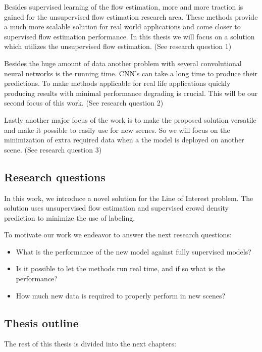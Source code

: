 Besides supervised learning of the flow estimation, more and more traction is gained for the unsupervised flow estimation research area. These methods provide a much more scalable solution for real world applications and come closer to supervised flow estimation performance. In this thesis we will focus on a solution which utilizes the unsupervised flow estimation. (See research question 1)

Besides the huge amount of data another problem with several convolutional neural networks is the running time. CNN’s can take a long time to produce their predictions. To make methods applicable for real life applications quickly producing results with minimal performance degrading is crucial. This will be our second focus of this work. (See research question 2)

Lastly another major focus of the work is to make the proposed solution versatile and make it possible to easily use for new scenes. So we will focus on the minimization of extra required data when a the model is deployed on another scene. (See research question 3)

\subsection{Research questions}
In this work, we introduce a novel solution for the Line of Interest problem. The solution uses unsupervised flow estimation and supervised crowd density prediction to minimize the use of labeling.

To motivate our work we endeavor to answer the next research questions:
\begin{itemize}
    \item What is the performance of the new model against fully supervised models?
    \item Is it possible to let the methods run real time, and if so what is the performance?
    \item How much new data is required to properly perform in new scenes?
\end{itemize}

\subsection{Thesis outline}
The rest of this thesis is divided into the next chapters:

